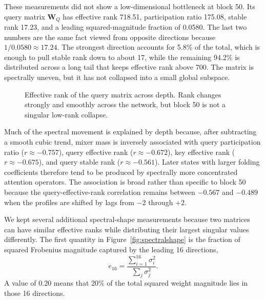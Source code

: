 \documentclass[11pt]{article}
\newcommand{\mat}[1]{\mathbf{#1}}
\begin{document}
These measurements did not show a low-dimensional bottleneck at block 50. Its query matrix $\mat{W}_Q$ has effective rank 718.51, participation ratio 175.08, stable rank 17.23, and a leading squared-magnitude fraction of 0.0580. The last two numbers are the same fact viewed from opposite directions because $1/0.0580\approx17.24$. The strongest direction accounts for 5.8\% of the total, which is enough to pull stable rank down to about 17, while the remaining 94.2\% is distributed across a long tail that keeps effective rank above 700. The matrix is spectrally uneven, but it has not collapsed into a small global subspace.

\begin{figure}[H]
\centering
{}
\caption{Effective rank of the query matrix across depth. Rank changes strongly and smoothly across the network, but block 50 is not a singular low-rank collapse.}
\label{fig:qrank}
\end{figure}

Much of the spectral movement is explained by depth because, after subtracting a smooth cubic trend, mixer mass is inversely associated with query participation ratio ($r\approx-0.757$), query effective rank ($r\approx-0.672$), key effective rank ($r\approx-0.675$), and query stable rank ($r\approx-0.561$). Later states with larger folding coefficients therefore tend to be produced by spectrally more concentrated attention operators. The association is broad rather than specific to block 50 because the query-effective-rank correlation remains between $-0.567$ and $-0.489$ when the profiles are shifted by lags from $-2$ through $+2$.

We kept several additional spectral-shape measurements because two matrices can have similar effective ranks while distributing their largest singular values differently. The first quantity in Figure~\ref{fig:spectralshape} is the fraction of squared Frobenius magnitude captured by the leading 16 directions,
\begin{equation}
e_{16}=\frac{\sum_{i=1}^{16}\sigma_i^2}{\sum_j\sigma_j^2}.
\end{equation}
A value of 0.20 means that 20\% of the total squared weight magnitude lies in those 16 directions.
\end{document}
